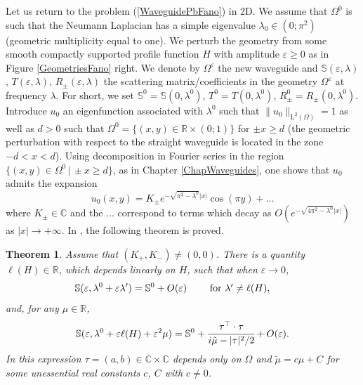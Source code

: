 \documentclass[11pt,a4paper]{report}
\newcommand{\eps}{\varepsilon}
\newcommand{\Om}{\Omega}
\newcommand{\mrm}[1]{\mathrm{#1}}
\newcommand{\Cplx}{\mathbb{C}}
\newcommand{\R}{\mathbb{R}}
\newcommand{\mL}{\mrm{L}}
\newtheorem{theorem}{Theorem}[chapter]
\begin{document}
Let us return to the problem (\ref{WaveguidePbFano}) in 2D. We assume that $\Om^0$ is such that the Neumann Laplacian has a simple eigenvalue $\lambda_0\in(0;\pi^2)$ (geometric multiplicity equal to one). We perturb the geometry from some smooth compactly supported profile function $H$ with amplitude $\eps\ge0$ as in Figure \ref{GeometriesFano} right. We denote by $\Om^{\eps}$ the new waveguide and $\mathbb{S}(\eps,\lambda)$, $T(\eps,\lambda)$, $R_\pm(\eps,\lambda)$ the scattering matrix/coefficients in the geometry $\Om^{\eps}$ at frequency $\lambda$. For short, we set $\mathbb{S}^0=\mathbb{S}(0,\lambda^0)$, $T^0=T(0,\lambda^0)$, $R^0_\pm=R_\pm(0,\lambda^0)$. Introduce $u_0$ an eigenfunction associated with $\lambda^0$ such that $\|u_0\|_{\mL^2(\Om)}=1$ as well as $d>0$ such that $\Om^0=\{(x,y)\in\R\times(0;1)\}$ for $\pm x\ge d$ (the geometric perturbation with respect to the straight waveguide is located in the zone $-d<x<d$). Using decomposition in Fourier series in the region $\{(x,y)\in\Om^0\,|\, \pm x \ge d\}$, as in Chapter \ref{ChapWaveguides}, one shows that $u_0$ admits the expansion 
\[
u_0(x,y)=K_{\pm}e^{-\sqrt{\pi^2-\lambda^0}|x|}\cos(\pi y)+\dots
\]
where $K_{\pm}\in\Cplx$ and the $\dots$ correspond to terms which decay as $O(e^{-\sqrt{4\pi^2-\lambda^0}|x|})$ as $|x|\to+\infty$. In \cite{ChNa18}, the following theorem is proved. 
\begin{theorem} \label{TheoremFano}
Assume that $(K_+,K_-)\ne(0,0)$. There is a quantity $\ell(H)\in\R$, which depends linearly on $H$, such that when $\eps\to0$,
\begin{equation}\label{Fano1}
\mathbb{S}(\eps,\lambda^0+\eps\lambda')=\mathbb{S}^0+O(\eps)\qquad\mbox{ for $\lambda'\ne\ell(H)$},\hspace{0.7cm}
\end{equation}
and, for any $\mu\in\R$,
\begin{equation}\label{Fano2}
\mathbb{S}(\eps,\lambda^0+\eps\ell(H)+\eps^2\mu)=\mathbb{S}^0+\cfrac{\tau^{\top}\cdot\tau}{i\tilde{\mu}-|\tau|^2/2}+O(\eps).
\end{equation}
In this expression $\tau=(a,b)\in\Cplx\times\Cplx$ depends only on $\Om$ and $\tilde{\mu}=c\mu+C$ for some unessential real constants $c$, $C$ with $c\ne0$.
\end{theorem}
\end{document}
